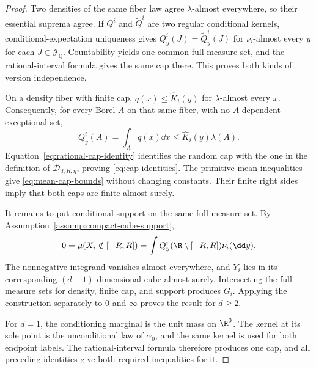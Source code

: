 \begin{proof}
Two densities of the same fiber law agree $\lambda$-almost everywhere, so
their essential suprema agree.  If $Q^i$ and $\widetilde Q^i$ are two regular
conditional kernels, conditional-expectation uniqueness gives
$Q^i_y(J)=\widetilde Q^i_y(J)$ for $\nu_i$-almost every $y$ for each
$J\in\mathscr J_{\mathbb Q}$.  Countability yields one common full-measure
set, and the rational-interval formula gives the same cap there.  This proves
both kinds of version independence.

On a density fiber with finite cap,
$q(x)\leq\widehat K_i(y)$ for $\lambda$-almost every $x$.  Consequently,
for every Borel $A$ on that same fiber, with no $A$-dependent exceptional
set,
\[
Q^i_y(A)=\int_Aq(x)\dd x
\leq\widehat K_i(y)\lambda(A).
\]
Equation~\eqref{eq:rational-cap-identity} identifies the random cap with the
one in the definition of $\mathcal D_{d,R,\eta}$, proving
\eqref{eq:cap-identities}.  The primitive mean inequalities give
\eqref{eq:mean-cap-bounds} without changing constants.  Their finite right
sides imply that both caps are finite almost surely.

It remains to put conditional support on the same full-measure set.  By
Assumption~\ref{assump:compact-cube-support},
\[
0=\mu(X_i\notin[-R,R])
=\int Q^i_y(\R\setminus[-R,R])\nu_i(\dd y).
\]
The nonnegative integrand vanishes almost everywhere, and $Y_i$ lies in its
corresponding $(d-1)$-dimensional cube almost surely.  Intersecting the
full-measure sets for density, finite cap, and support produces $G_i$.
Applying the construction separately to $0$ and $\infty$ proves the result
for $d\geq2$.

For $d=1$, the conditioning marginal is the unit mass on $\R^0$.  The kernel
at its sole point is the unconditional law of $\alpha_0$, and the same kernel
is used for both endpoint labels.  The rational-interval formula therefore
produces one cap, and all preceding identities give both required
inequalities for it.
\end{proof}

